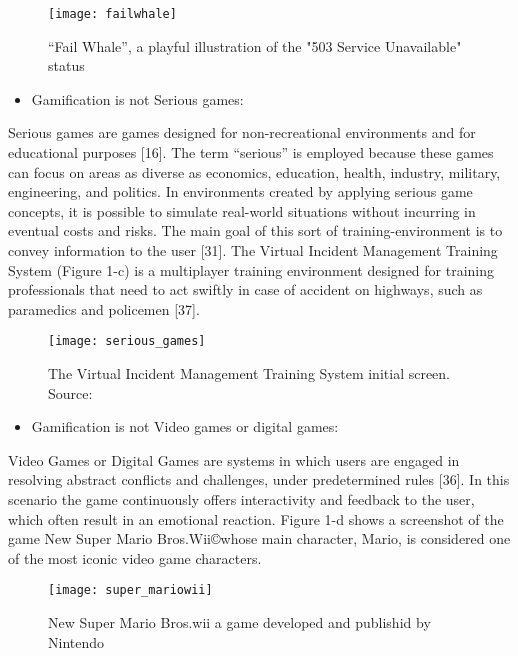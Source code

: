 \begin{figure}[h!]
\caption{“Fail Whale”, a playful illustration of the "503 Service Unavailable" status}
\centering
\texttt{[image: failwhale]}
\label{fig:failwhale}
\end{figure}

\begin{itemize}
\item Gamification is not Serious games:
\end{itemize}

Serious games are games designed for non-recreational
environments and for educational purposes [16]. The term
“serious” is employed because these games can focus on areas as
diverse as economics, education, health, industry, military,
engineering, and politics. In environments created by applying
serious game concepts, it is possible to simulate real-world
situations without incurring in eventual costs and risks. The main
goal of this sort of training-environment is to convey information
to the user [31]. The Virtual Incident Management Training System
(Figure 1-c) is a multiplayer training environment designed for
training professionals that need to act swiftly in case of accident on
highways, such as paramedics and policemen [37].

\begin{figure}[h!]
\caption{The Virtual Incident Management Training System initial screen. Source: \cite{catt_lab2017}}
\centering
\texttt{[image: serious\_games]}
\label{fig:serious_games}
\end{figure}

\begin{itemize}
\item Gamification is not Video games or digital games:
\end{itemize}

Video Games or Digital Games are systems in which users are
engaged in resolving abstract conflicts and challenges, under
predetermined rules [36]. In this scenario the game continuously
offers interactivity and feedback to the user, which often result in
an emotional reaction. Figure 1-d shows a screenshot of the game
New Super Mario Bros.Wii\copyright whose main character, Mario, is
considered one of the most iconic video game characters.

\begin{figure}[h!]
\caption{New Super Mario Bros.wii a game developed and publishid by Nintendo}
\centering
\texttt{[image: super\_mariowii]}
\label{fig:super_mariowii}
\end{figure}

